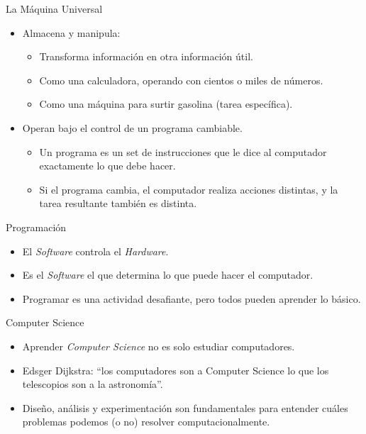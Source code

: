 \documentclass[10pt]{beamer}
\begin{document}
\begin{frame}{La M\'aquina Universal}
	\begin{itemize}
		\item Almacena y manipula:
		\begin{itemize}
			\item Transforma informaci\'on en otra informaci\'on \'util.
			\item Como una calculadora, operando con cientos o miles de n\'umeros.
			\item Como una m\'aquina para surtir gasolina (tarea espec\'ifica).
		\end{itemize}
		\item Operan bajo el control de un programa cambiable.
		\begin{itemize}
			\item Un programa es un set de instrucciones que le dice al computador exactamente lo 
			que debe hacer.
			\item Si el programa cambia, el computador realiza acciones distintas, y la tarea resultante
			tambi\'en es distinta.
		\end{itemize}
	\end{itemize}
\end{frame}

\begin{frame}{Programaci\'on}
	\begin{itemize}
		\item El \textit{Software} controla el \textit{Hardware}.
		\item Es el \textit{Software} el que determina lo que puede hacer el computador.
		\item Programar es una actividad desafiante, pero todos pueden aprender lo b\'asico.
	\end{itemize}
\end{frame}

\begin{frame}{Computer Science}
	\begin{itemize}\small
		\item Aprender \textit{Computer Science} no es solo estudiar computadores.
		\item Edsger Dijkstra: “los computadores son a Computer Science lo que los telescopios son a la astronomía”.
		\item Dise\~no, an\'alisis y experimentaci\'on son fundamentales para entender cu\'ales problemas
		      podemos (o no) resolver computacionalmente.
	\end{itemize}
\end{frame}
\end{document}
